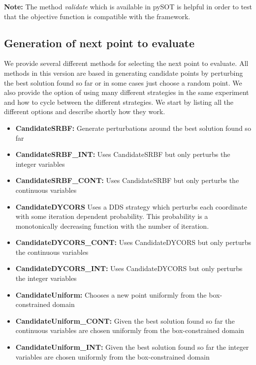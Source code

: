 \documentclass[]{article}
\begin{document}
\textbf{Note:} The method \textit{validate} which is available in pySOT is helpful in order to test that the objective function is compatible with the framework. \newline

\subsection{Generation of next point to evaluate} 
\label{search}
We provide several different methods for selecting the next point to evaluate. All methods in this version are based in generating candidate points by perturbing the best solution found so far or in some cases just choose a random point. We also provide the option of using many different strategies in the same experiment and how to cycle between the different strategies. We start by listing all the different options and describe shortly how they work.
\begin{itemize}
\item \textbf{CandidateSRBF:} Generate perturbations around the best solution found so far
\item \textbf{CandidateSRBF\_INT:} Uses CandidateSRBF but only perturbs the integer variables
\item \textbf{CandidateSRBF\_CONT:} Uses CandidateSRBF but only perturbs the continuous variables
\item \textbf{CandidateDYCORS} Uses a DDS strategy which perturbs each coordinate with some iteration dependent probability. This probability is a monotonically decreasing function with the number of iteration.
\item \textbf{CandidateDYCORS\_CONT:} Uses CandidateDYCORS but only perturbs the continuous variables
\item \textbf{CandidateDYCORS\_INT:} Uses CandidateDYCORS but only perturbs the integer variables
\item \textbf{CandidateUniform:} Chooses a new point uniformly from the box-constrained domain
\item \textbf{CandidateUniform\_CONT:} Given the best solution found so far the continuous variables are chosen uniformly from the box-constrained domain
\item \textbf{CandidateUniform\_INT:} Given the best solution found so far the integer variables are chosen uniformly from the box-constrained domain
\end{itemize}
\end{document}
